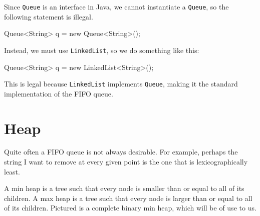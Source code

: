 Since \texttt{Queue} is an interface in Java, we cannot instantiate a \texttt{Queue}, so the following statement is illegal.

\begin{mylstlisting}
Queue<String> q = new Queue<String>();
\end{mylstlisting}

Instead, we must use \texttt{LinkedList}, so we do something like this:

\begin{mylstlisting}
Queue<String> q = new LinkedList<String>();
\end{mylstlisting}

This is legal because \texttt{LinkedList} implements \texttt{Queue}, making it the standard implementation of the FIFO queue.

\section{Heap}

Quite often a FIFO queue is not always desirable. For example, perhaps the string I want to remove at every given point is the one that is lexicographically least.

A min heap is a tree such that every node is smaller than or equal to all of its children. A max heap is a tree such that every node is larger than or equal to all of its children. Pictured is a complete binary min heap, which will be of use to us.

\begin{center}
\end{center}


